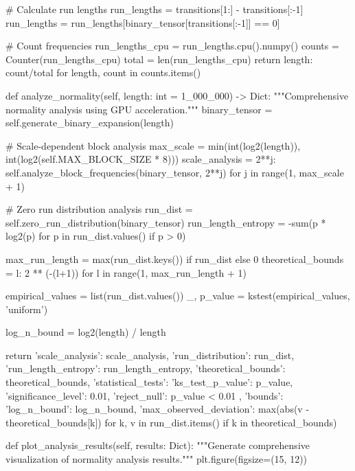         # Calculate run lengths
        run_lengths = transitions[1:] - transitions[:-1]
        run_lengths = run_lengths[binary_tensor[transitions[:-1]] == 0]
        
        # Count frequencies
        run_lengths_cpu = run_lengths.cpu().numpy()
        counts = Counter(run_lengths_cpu)
        total = len(run_lengths_cpu)
        return {length: count/total for length, count in counts.items()}

    def analyze_normality(self, length: int = 1_000_000) -> Dict:
        """Comprehensive normality analysis using GPU acceleration."""
        binary_tensor = self.generate_binary_expansion(length)
        
        # Scale-dependent block analysis
        max_scale = min(int(log2(length)), int(log2(self.MAX_BLOCK_SIZE * 8)))
        scale_analysis = {
            2**j: self.analyze_block_frequencies(binary_tensor, 2**j)
            for j in range(1, max_scale + 1)
        }
        
        # Zero run distribution analysis
        run_dist = self.zero_run_distribution(binary_tensor)
        run_length_entropy = -sum(p * log2(p) for p in run_dist.values() if p > 0)
        
        max_run_length = max(run_dist.keys()) if run_dist else 0
        theoretical_bounds = {l: 2 ** (-(l+1)) for l in range(1, max_run_length + 1)}
        
        empirical_values = list(run_dist.values())
        _, p_value = kstest(empirical_values, 'uniform')
        
        log_n_bound = log2(length) / length
        
        return {
            'scale_analysis': scale_analysis,
            'run_distribution': run_dist,
            'run_length_entropy': run_length_entropy,
            'theoretical_bounds': theoretical_bounds,
            'statistical_tests': {
                'ks_test_p_value': p_value,
                'significance_level': 0.01,
                'reject_null': p_value < 0.01
            },
            'bounds': {
                'log_n_bound': log_n_bound,
                'max_observed_deviation': max(abs(v - theoretical_bounds[k])
                                           for k, v in run_dist.items()
                                           if k in theoretical_bounds)
            }
        }

    def plot_analysis_results(self, results: Dict):
        """Generate comprehensive visualization of normality analysis results."""
        plt.figure(figsize=(15, 12))
        
